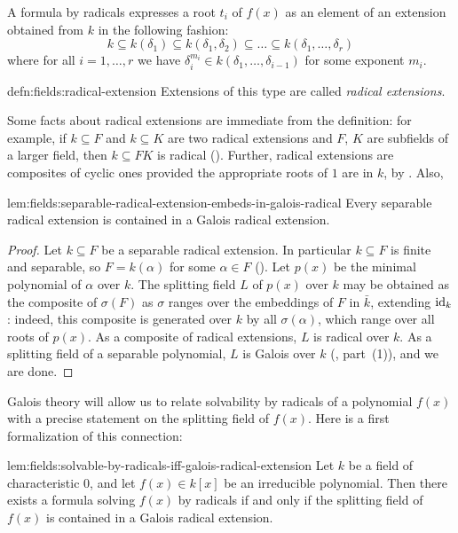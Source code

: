 A formula by radicals expresses a root $t_i$ of $f(x)$ as an element
of an extension obtained from $k$ in the following fashion:
\[
  k \subseteq k(\delta_1) \subseteq k(\delta_1, \delta_2) \subseteq
  \dots \subseteq k(\delta_1, \dots, \delta_r)
\]
where for all $i = 1, \dots, r$ we have
$\delta_i^{m_i} \in k(\delta_1, \dots, \delta_{i-1})$ for some
exponent $m_i$.

\begin{defn}{}{defn:fields:radical-extension}
  Extensions of this type are called \emph{radical extensions}.
\end{defn}
Some facts about radical extensions are immediate from the definition:
for example, if $k \subseteq F$ and $k \subseteq K$ are two radical
extensions and $F$, $K$ are subfields of a larger field, then
$k \subseteq FK$ is radical
(). Further,
radical extensions are composites of cyclic ones provided the
appropriate roots of $1$ are in $k$, by . Also,

\begin{lem}{}{lem:fields:separable-radical-extension-embeds-in-galois-radical}
  Every separable radical extension is contained in a Galois radical
  extension.
\end{lem}

\begin{proof}
  Let $k \subseteq F$ be a separable radical extension. In particular
  $k \subseteq F$ is finite and separable, so $F = k(\alpha)$ for some
  $\alpha \in F$ (). Let $p(x)$ be the minimal
  polynomial of $\alpha$ over $k$. The splitting field $L$ of $p(x)$
  over $k$ may be obtained as the composite of $\sigma(F)$ as $\sigma$
  ranges over the embeddings of $F$ in $\bar{k}$, extending $\operatorname{id}_k$:
  indeed, this composite is generated over $k$ by all
  $\sigma(\alpha)$, which range over all roots of $p(x)$. As a
  composite of radical extensions, $L$ is radical over $k$. As a
  splitting field of a separable polynomial, $L$ is Galois over $k$
  (, part~(1)), and we are done.
\end{proof}
Galois theory will allow us to relate solvability by radicals of a
polynomial $f(x)$ with a precise statement on the splitting field of
$f(x)$. Here is a first formalization of this connection:

\begin{lem}{}{lem:fields:solvable-by-radicals-iff-galois-radical-extension}
  Let $k$ be a field of characteristic $0$, and let $f(x) \in k[x]$ be
  an irreducible polynomial. Then there exists a formula solving
  $f(x)$ by radicals if and only if the splitting field of $f(x)$ is
  contained in a Galois radical extension.
\end{lem}

